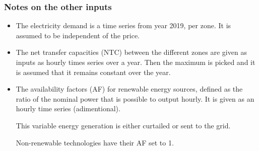 \subsubsection{Notes on the other inputs}

\begin{itemize}
    \item The electricity demand is a time series from year 2019, per zone. It is assumed to be independent of the price.
    \item The net transfer capacities (NTC) between the different zones are given as inputs as hourly times series over a year. Then the maximum is picked and it is assumed that it remains constant over the year.
    \item The availability factors (AF) for renewable energy sources, defined as the ratio of the nominal power that is possible to output hourly. It is given as an hourly time series (adimentional).
    
    This variable energy generation is either curtailed or sent to the grid.

    Non-renewable technologies have their AF set to 1.
\end{itemize}
